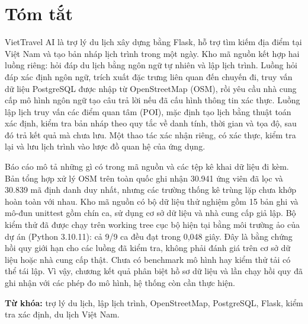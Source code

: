\documentclass[vietnamese]{sicaireport}
\begin{document}
\renewcommand{\contentsname}{Mục lục}
\renewcommand{\listfigurename}{Danh sách hình}
\renewcommand{\listtablename}{Danh sách bảng}
\renewcommand{\chaptername}{Chương}
\renewcommand{\appendixname}{Phụ lục}
\renewcommand{\figurename}{Hình}
\renewcommand{\tablename}{Bảng}

\makecoverpage
\maketitledetailpage

\setcounter{page}{1}

\chapter*{Tóm tắt}
VietTravel AI là trợ lý du lịch xây dựng bằng Flask, hỗ trợ tìm kiếm địa điểm tại Việt Nam và tạo bản nháp lịch trình trong một ngày. Kho mã nguồn kết hợp hai luồng riêng: hỏi đáp du lịch bằng ngôn ngữ tự nhiên và lập lịch trình. Luồng hỏi đáp xác định ngôn ngữ, trích xuất đặc trưng liên quan đến chuyến đi, truy vấn dữ liệu PostgreSQL được nhập từ OpenStreetMap (OSM), rồi yêu cầu nhà cung cấp mô hình ngôn ngữ tạo câu trả lời nếu đã cấu hình thông tin xác thực. Luồng lập lịch truy vấn các điểm quan tâm (POI), mặc định tạo lịch bằng thuật toán xác định, kiểm tra bản nháp theo quy tắc về danh tính, thời gian và tọa độ, sau đó trả kết quả mà chưa lưu. Một thao tác xác nhận riêng, có xác thực, kiểm tra lại và lưu lịch trình vào lược đồ quan hệ của ứng dụng.

Báo cáo mô tả những gì có trong mã nguồn và các tệp kê khai dữ liệu đi kèm. Bản tổng hợp xử lý OSM trên toàn quốc ghi nhận 30.941 ứng viên đã lọc và 30.839 mã định danh duy nhất, nhưng các trường thống kê trùng lặp chưa khớp hoàn toàn với nhau. Kho mã nguồn có bộ dữ liệu thử nghiệm gồm 15 bản ghi và mô-đun unittest gồm chín ca, sử dụng cơ sở dữ liệu và nhà cung cấp giả lập. Bộ kiểm thử đã được chạy trên working tree cục bộ hiện tại bằng môi trường ảo của dự án (Python 3.10.11): cả 9/9 ca đều đạt trong 0,048 giây. Đây là bằng chứng hồi quy giới hạn cho các luồng đã kiểm tra, không phải đánh giá trên cơ sở dữ liệu hoặc nhà cung cấp thật. Chưa có benchmark mô hình hay kiểm thử tải có thể tái lập. Vì vậy, chương kết quả phân biệt hồ sơ dữ liệu và lần chạy hồi quy đã ghi nhận với các phép đo mô hình, hệ thống còn cần thực hiện.

\medskip
\noindent\textbf{Từ khóa:} trợ lý du lịch, lập lịch trình, OpenStreetMap, PostgreSQL, Flask, kiểm tra xác định, du lịch Việt Nam.
\clearpage

\renewcommand{\contentsname}{Mục lục}
\setcounter{tocdepth}{2}
\tableofcontents
\clearpage
\listoffigures
\clearpage
\listoftables
\clearpage
\end{document}
